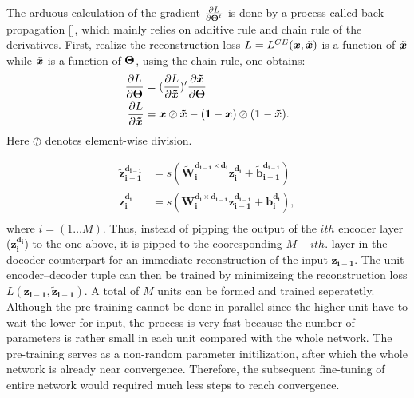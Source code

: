 The arduous calculation of the gradient $\frac{\partial L}{\partial \boldsymbol{\Theta}^t}$ is done by a process called back propagation [], which mainly relies on additive rule and chain rule of the derivatives. First, realize the reconstruction loss $L=L^{CE}(\boldsymbol{x}, \boldsymbol{\tilde{x}})$ is a function of $\boldsymbol{\tilde{x}}$ while $\boldsymbol{\tilde{x}}$ is a function of $\boldsymbol{\Theta}$, using the chain rule, one obtains:
\begin{equation*}
\begin{split}
  \frac{\partial L}{\partial \boldsymbol{\Theta}} &= (\frac{\partial L}{\partial \boldsymbol{\tilde{x}}})^{\prime} \frac{\partial \boldsymbol{\tilde{x}}}{\partial \boldsymbol{\Theta}} \\
  \frac{\partial L}{\partial \boldsymbol{\tilde{x}}} &= \boldsymbol{x} \oslash \boldsymbol{\tilde{x}} - (\boldsymbol{1} - \boldsymbol{x}) \oslash (\boldsymbol{1} - \boldsymbol{\tilde{x}}).
\end{split}
\end{equation*}
Here $\oslash$ denotes element-wise division.


\begin{equation} \label{eq:unit encoder-decoder}
\begin{split}
  \boldsymbol{\tilde{z}_{i-1}^{d_{i-1}}} &= s(\boldsymbol{\tilde{W}_{i  }^{d_{i-1} \times d_{i  }} z_{i  }^{d_{i  }}}+\boldsymbol{\tilde{b}_{i-1}^{d_{i-1}}}) \\
  \boldsymbol{z_{i  }^{d_{i  }}}         &= s(\boldsymbol{W_{i  }^{d_{i  } \times d_{i-1}} z_{i-1}^{d_{i-1}}}+\boldsymbol{b_{i  }^{d_{i  }}}), \\
\end{split}
\end{equation}
where $i=(1 \ldots M)$. Thus, instead of pipping the output of the $i th$ encoder layer ($\boldsymbol{z_{i  }^{d_{i  }}}$) to the one above, it is pipped to the cooresponding $M-i th.$ layer in the docoder counterpart for an immediate reconstruction of the input $\boldsymbol{z_{i-1}}$. The unit encoder--decoder tuple can then be trained by minimizeing the reconstruction loss $L(\boldsymbol{z_{i-1}},\boldsymbol{\tilde{z}_{i-1}})$. A total of $M$ units can be formed and trained seperatetly. Although the pre-training cannot be done in parallel since the higher unit have to wait the lower for input, the process is very fast because the number of parameters is rather small in each unit compared with the whole network. The pre-training serves as a non-random parameter initilization, after which the whole network is already near convergence. Therefore, the subsequent fine-tuning of entire network would required much less steps to reach convergence.

